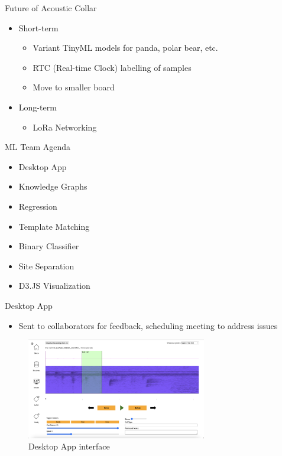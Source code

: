 \begin{frame}{Future of Acoustic Collar}
    \begin{itemize}
        \item Short-term
        \begin{itemize}
            \item Variant TinyML models for panda, polar bear, etc.
            \item RTC (Real-time Clock) labelling of samples
            \item Move to smaller board
        \end{itemize}
        \item Long-term
        \begin{itemize}
            \item LoRa Networking
        \end{itemize}
    \end{itemize}
\end{frame}

\begin{frame}{ML Team Agenda}
    \begin{itemize}
        \item Desktop App
        \item Knowledge Graphs
        \item Regression
        \item Template Matching
        \item Binary Classifier
        \item Site Separation
        \item D3.JS Visualization
    \end{itemize}
\end{frame}

\begin{frame}{Desktop App}
    \begin{itemize}
        \item Sent to collaborators for feedback, scheduling meeting to address issues
    \end{itemize}
    \begin{figure}
        \centering
        \includegraphics[height=0.7\textheight,width=0.7\textwidth,keepaspectratio]{images/desktop_app_1.png}
        \caption{Desktop App interface}
    \end{figure}
\end{frame}

